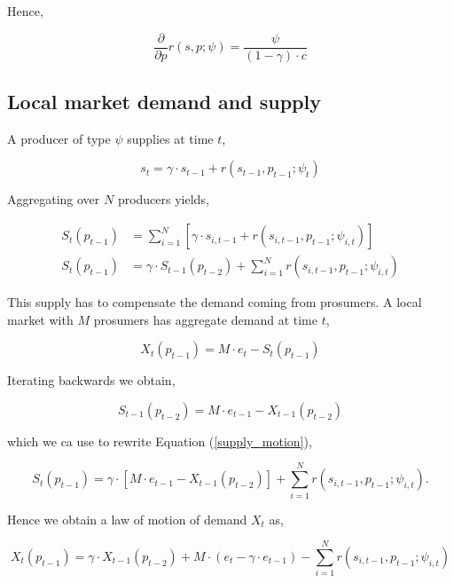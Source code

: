 \documentclass[american]{scrartcl}
\begin{document}
Hence,

\begin{equation} \label{foc_rp}
	\frac{\partial}{\partial p} r(s, p; \psi) = \frac{\psi}{(1-\gamma) \cdot c}
\end{equation}

\subsection{Local market demand and supply}

A producer of type $\psi$ supplies at time $t$,

\begin{equation}
	s_t = \gamma \cdot s_{t-1} + r(s_{t-1}, p_{t-1}; \psi_t)
\end{equation}

Aggregating over $N$ producers yields,

\begin{equation} \label{supply_motion}
	\begin{split}
		S_t(p_{t-1}) &= \sum^N_{i = 1} \left[ \gamma \cdot s_{i, t-1} + r(s_{i, t-1}, p_{t-1}; \psi_{i, t}) \right] \\
		S_t(p_{t-1}) &= \gamma \cdot S_{t-1}(p_{t-2}) + \sum^N_{i = 1}  r(s_{i, t-1}, p_{t-1}; \psi_{i, t})
	\end{split}
\end{equation}

This supply has to compensate the demand coming from prosumers. A local market with $M$ prosumers has aggregate demand at time $t$,

\begin{equation}
	X_t(p_{t-1}) = M \cdot e_t - S_t(p_{t-1})
\end{equation}

Iterating backwards we obtain,

\begin{equation}
	S_{t-1}(p_{t-2}) = M \cdot e_{t-1} - X_{t-1}(p_{t-2})
\end{equation}

which we ca use to rewrite Equation (\ref{supply_motion}),

\begin{equation}
	S_t(p_{t-1}) = \gamma \cdot \left[ M \cdot e_{t-1} - X_{t-1}(p_{t-2}) \right] + \sum^N_{i = 1}  r(s_{i, t-1}, p_{t-1}; \psi_{i, t}).
\end{equation}

Hence we obtain a law of motion of demand $X_t$ as,

\begin{equation}
	X_t(p_{t-1}) = \gamma \cdot X_{t-1}(p_{t-2}) + M \cdot \left( e_t - \gamma \cdot e_{t-1} \right) - \sum^N_{i = 1}  r(s_{i, t-1}, p_{t-1}; \psi_{i, t})
\end{equation}
\end{document}
